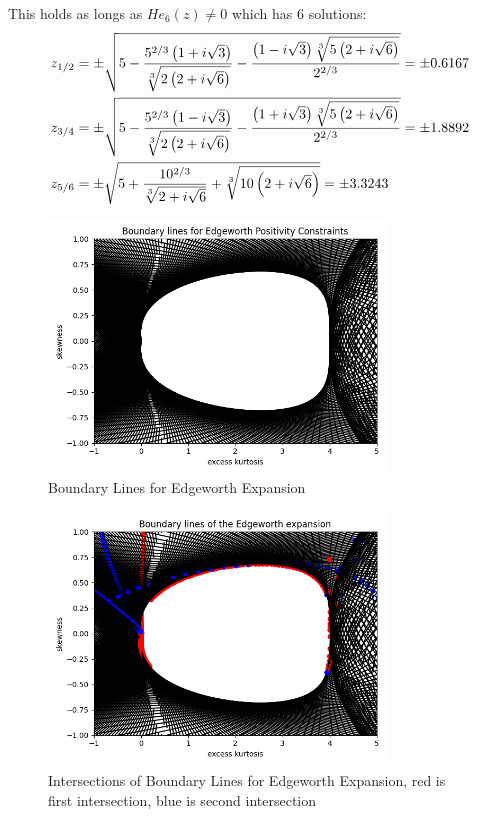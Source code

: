 This holds as longs as $He_6(z)\neq 0$ which has 6 solutions:
\begin{align}
    z_{1/2} &= \pm \sqrt{5-\frac{5^{2/3}\left(1+i\sqrt{3}\right)}{\sqrt[3]{2\left(2+i\sqrt{6}\right)}} - \frac{\left(1-i\sqrt{3}\right)\sqrt[3]{5\left(2+i\sqrt{6}\right)}}{2^{2/3}}} = \pm 0.6167 \notag\\
    z_{3/4} &= \pm \sqrt{5-\frac{5^{2/3}\left(1-i\sqrt{3}\right)}{\sqrt[3]{2\left(2+i\sqrt{6}\right)}} - \frac{\left(1+i\sqrt{3}\right)\sqrt[3]{5\left(2+i\sqrt{6}\right)}}{2^{2/3}}} = \pm 1.8892 \notag \\
    z_{5/6} &= \pm \sqrt{5+\frac{10^{2/3}}{\sqrt[3]{2+i\sqrt{6}}} + \sqrt[3]{10\left(2+i\sqrt{6}\right)}} = \pm 3.3243 \notag
\end{align}

\begin{figure}[h]
    \centering
    \includegraphics[width=0.8\textwidth]{img/edgeworth_positivity_boundary_lines.png}
    \caption{Boundary Lines for Edgeworth Expansion}
    \label{fig:ew_boundary_lines}
\end{figure}
\begin{figure}[h]
    \centering
    \includegraphics[width=0.8\textwidth]{img/edgeworth_positivity_boundary_intersections_1.png}
    \caption{Intersections of Boundary Lines for Edgeworth Expansion, red is first intersection, blue is second intersection}
    \label{fig:ew_boundary_intersections_1}
\end{figure}
